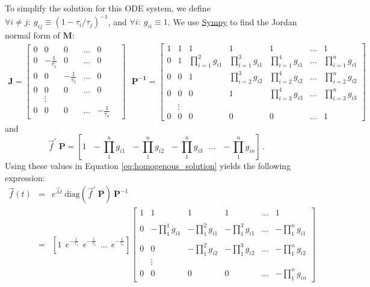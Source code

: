 \documentclass{article}
\newcommand{\finit}{\ensuremath{\vec{f}^\circ}}
\begin{document}
To simplify the solution for this ODE system, we define $\forall i \neq j:~g_{ij} \equiv (1 - \tau_i/\tau_j)^{-1}$, and $\forall i:~g_{ii} \equiv 1$. We use \href{https://www.sympy.org/}{Sympy} to find the Jordan normal form of $\mathbf{M}$:
\begin{eqnarray}
\mathbf{J} =
  \begin{bmatrix}
    0 & 0 & 0 & \ldots & 0 \\
    0 & -\frac{1}{\tau_1} & 0 & \ldots & 0 \\
    0 & 0 & -\frac{1}{\tau_2} & \ldots & 0 \\
    0 & 0 & 0 & \ldots & 0 \\
     & \vdots & & & & \\
    0 & 0 & 0 & \ldots & -\frac{1}{\tau_n}
\end{bmatrix}
~~~
\mathbf{P^{-1}} =
\begin{bmatrix}
1 & 1 & 1 & 1 & 1 & \ldots & 1 \\
0 & 1 & \prod_{i=1}^2 g_{i1} & \prod_{i=1}^3 g_{i1} & \prod_{i=1}^4 g_{i1} & \ldots & \prod_{i=1}^n g_{i1} \\
0 & 0 & 1 & \prod_{i=2}^3 g_{i2} & \prod_{i=2}^4 g_{i2} & \ldots & \prod_{i=2}^n g_{i2} \\
0 & 0 & 0 & 1 & \prod_{i=3}^4 g_{i3} & \ldots & \prod_{i=3}^n g_{i3} \\
& \vdots & & & & & \\
0 & 0 & 0 & 0 & 0 & \ldots & 1
\end{bmatrix}
\end{eqnarray}
and\[\finit~\mathbf{P} = \left[1 ~~~ -\prod_1^n g_{i1} ~~~ -\prod_1^n g_{i2} ~~~ -\prod_1^n g_{i3} ~~~ \ldots ~~~ -\prod_1^n g_{in} \right]\,.\]
Using these values in Equation \ref{eq:homogenous_solution} yields the following expression:
\begin{eqnarray}
	\vec{f}(t) &=& e^{\vec{\lambda} t} ~ \text{diag}\left(\finit~\mathbf{P}\right) ~ \mathbf{P}^{-1} \nonumber\\
	&=&
	\left[ 1 ~~ e^{-\frac{t}{\tau_1}} ~~ e^{-\frac{t}{\tau_2}} ~~ \ldots ~~ e^{-\frac{t}{\tau_n}}\right]
    \begin{bmatrix}
        1 & 1 & 1 & 1 & \ldots & 1 \\ \\
        0 & -\prod_1^1 g_{i1} & -\prod_1^2 g_{i1} & -\prod_1^3 g_{i1}  & \ldots & -\prod_1^n g_{i1} \\ \\
        0 & 0 & -\prod_1^2 g_{i2} & -\prod_1^3 g_{i2} & \ldots & -\prod_1^n g_{i2} \\
         & \vdots & & & & \\
        0 & 0 & 0 & 0 & \ldots & -\prod_1^n g_{in}
    \end{bmatrix}\label{eq:lin_path_solution}
\end{eqnarray}
\end{document}
